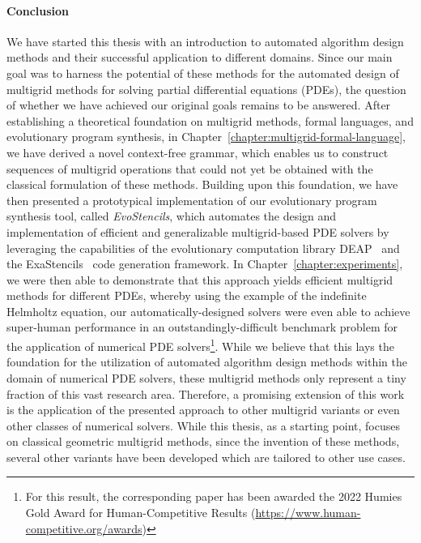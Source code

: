 \paragraph{Conclusion}
We have started this thesis with an introduction to automated algorithm design methods and their successful application to different domains.
Since our main goal was to harness the potential of these methods for the automated design of multigrid methods for solving partial differential equations (PDEs), the question of whether we have achieved our original goals remains to be answered.
After establishing a theoretical foundation on multigrid methods, formal languages, and evolutionary program synthesis, in Chapter~\ref{chapter:multigrid-formal-language}, we have derived a novel context-free grammar, which enables us to construct sequences of multigrid operations that could not yet be obtained with the classical formulation of these methods.
Building upon this foundation, we have then presented a prototypical implementation of our evolutionary program synthesis tool, called \emph{EvoStencils}, which automates the design and implementation of efficient and generalizable multigrid-based PDE solvers by leveraging the capabilities of the evolutionary computation library DEAP~\cite{rainville2012deap} and the ExaStencils~\cite{lengauer2020exastencils} code generation framework.
In Chapter~\ref{chapter:experiments}, we were then able to demonstrate that this approach yields efficient multigrid methods for different PDEs, whereby using the example of the indefinite Helmholtz equation, our automatically-designed solvers were even able to achieve super-human performance in an outstandingly-difficult benchmark problem for the application of numerical PDE solvers\footnote{For this result, the corresponding paper has been awarded the 2022 Humies Gold Award for Human-Competitive Results (\url{https://www.human-competitive.org/awards})}.
While we believe that this lays the foundation for the utilization of automated algorithm design methods within the domain of numerical PDE solvers, these multigrid methods only represent a tiny fraction of this vast research area.
Therefore, a promising extension of this work is the application of the presented approach to other multigrid variants or even other classes of numerical solvers.
While this thesis, as a starting point, focuses on classical geometric multigrid methods, since the invention of these methods, several other variants have been developed which are tailored to other use cases.
